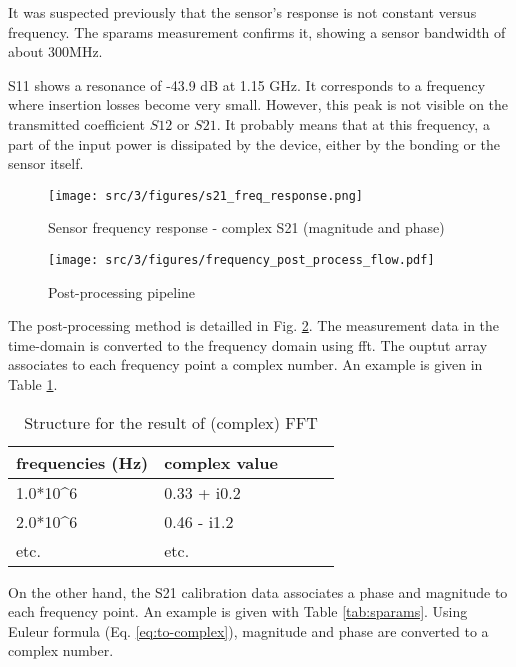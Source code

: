 It was suspected previously that the sensor's response is not constant versus frequency.
The \gls{sparams} measurement confirms it, showing a sensor bandwidth of about 300MHz.

S11 shows a resonance of -43.9 dB at 1.15 GHz.
It corresponds to a frequency where insertion losses become very small.
However, this peak is not visible on the transmitted coefficient $S12$ or $S21$.
It probably means that at this frequency, a part of the input power is dissipated by the device, either by the bonding or the sensor itself.


\begin{figure}[!h]
  \centering
  \texttt{[image: src/3/figures/s21\_freq\_response.png]}
  \caption{Sensor frequency response - complex S21 (magnitude and phase)}
  \label{fig:s21-response-complex}
\end{figure}

\begin{figure}[!h]
  \centering
  \texttt{[image: src/3/figures/frequency\_post\_process\_flow.pdf]}
  \caption{Post-processing pipeline}
  \label{fig:postprocess-nfs-pipeline}
\end{figure}

The post-processing method is detailled in Fig. \ref{fig:postprocess-nfs-pipeline}.
The measurement data in the time-domain is converted to the frequency domain using \gls{fft}.
The ouptut array associates to each frequency point a complex number.
An example is given in Table \ref{tab:complex-fft}.

\begin{table}[!h]
  \centering
  \begin{tabular}{@{}lllll@{}}
  \toprule
  frequencies (Hz)        & complex value                \\ \midrule
  1.0*10^6                & 0.33 + i0.2                  \\
  2.0*10^6                & 0.46 - i1.2                  \\
  etc.                    & etc.                         \\ \bottomrule
  \end{tabular}
  \caption{Structure for the result of (complex) FFT}
  \label{tab:complex-fft}
\end{table}

On the other hand, the S21 calibration data associates a phase and magnitude to each frequency point.
An example is given with Table \ref{tab:sparams}.
Using Euleur formula (Eq. \ref{eq:to-complex}), magnitude and phase are converted to a complex number.

